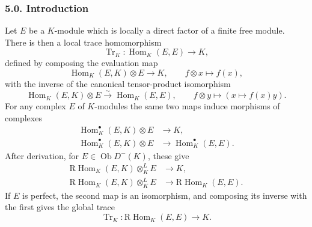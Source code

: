 \documentclass[11pt]{article}
\theoremstyle{plain}
\theoremstyle{definition}
\theoremstyle{remark}
\DeclareMathOperator{\Hom}{Hom}
\DeclareMathOperator{\ob}{Ob}
\DeclareMathOperator{\Tr}{Tr}
\newcommand{\R}{\mathrm R}
\begin{document}
\subsubsection*{5.0. Introduction}
Let $E$ be a $K$-module which is locally a direct factor of a finite free module. There is then a local trace homomorphism
\begin{equation}
   \Tr_K:\Hom_K(E,E)\to K,
   \tag{5.0.1}
\end{equation}
defined by composing the evaluation map
\begin{equation}
   \Hom_K(E,K)\otimes E\to K,
   \qquad f\otimes x\mapsto f(x),
   \tag{5.0.2}
\end{equation}
with the inverse of the canonical tensor-product isomorphism
\begin{equation}
   \Hom_K(E,K)\otimes E\xrightarrow{\sim}\Hom_K(E,E),
   \qquad f\otimes y\mapsto (x\mapsto f(x)y).
   \tag{5.0.3}
\end{equation}
For any complex $E$ of $K$-modules the same two maps induce morphisms of complexes
\begin{align}
   \Hom_K^{\bullet}(E,K)\otimes E&\to K,                         \tag{5.0.4}\\
   \Hom_K^{\bullet}(E,K)\otimes E&\to \Hom_K^{\bullet}(E,E).       \tag{5.0.5}
\end{align}
After derivation, for $E\in\ob D^-(K)$, these give
\begin{align}
   \R\Hom_K(E,K)\otimes_K^L E&\to K,                              \tag{5.0.6}\\
   \R\Hom_K(E,K)\otimes_K^L E&\to \R\Hom_K(E,E).                   \tag{5.0.7}
\end{align}
If $E$ is perfect, the second map is an isomorphism, and composing its inverse with the first gives the global trace
\begin{equation}
   \Tr_K:\R\Hom_K(E,E)\to K.                                      \tag{5.0.8}
\end{equation}
\end{document}
